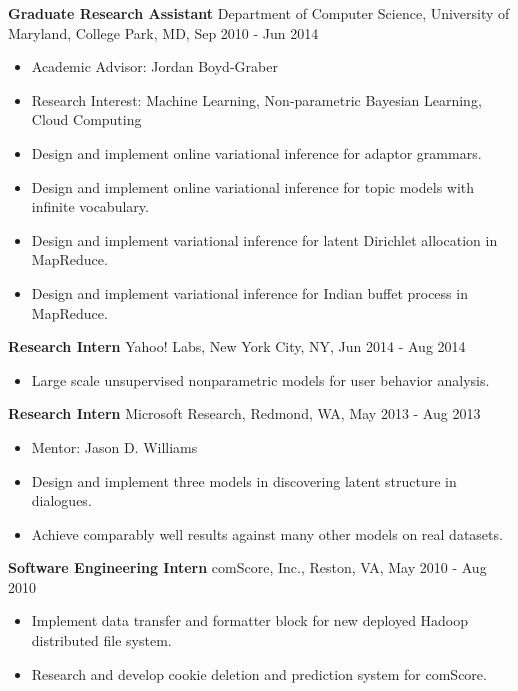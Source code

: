 {\bf Graduate Research Assistant} \hfill Department of Computer Science,
University of Maryland, College Park, MD, Sep 2010 - Jun 2014
\begin{itemize}
\item Academic Advisor: Jordan Boyd-Graber
\item Research Interest: Machine Learning, Non-parametric Bayesian Learning, Cloud Computing
\item Design and implement online variational inference for adaptor grammars.
\item Design and implement online variational inference for topic models with infinite vocabulary.
\item Design and implement variational inference for latent Dirichlet allocation in MapReduce.
\item Design and implement variational inference for Indian buffet process in MapReduce.
\end{itemize}

{\bf Research Intern} \hfill Yahoo! Labs, New York City, NY, Jun 2014 - Aug 2014
\begin{itemize}
\item Large scale unsupervised nonparametric models for user behavior analysis.
\end{itemize}

{\bf Research Intern} \hfill Microsoft Research, Redmond, WA, May 2013 - Aug 2013
\begin{itemize}
\item Mentor: Jason D. Williams
\item Design and implement three models in discovering latent structure in dialogues.
\item Achieve comparably well results against many other models on real datasets.
\end{itemize}

{\bf Software Engineering Intern} \hfill comScore, Inc., Reston, VA, May 2010 - Aug 2010
\begin{itemize}
\item Implement data transfer and formatter block for new deployed Hadoop distributed file system.
\item Research and develop cookie deletion and prediction system for comScore.
\end{itemize}


